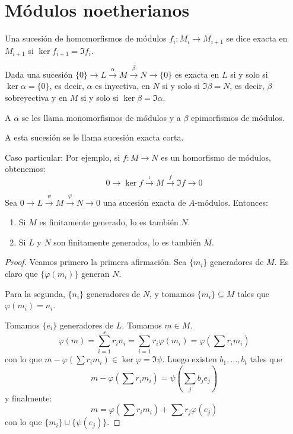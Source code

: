 \section{Módulos noetherianos}

\begin{df}
  Una sucesión de homomorfismos de módulos \(f_i:M_i\longrightarrow  M_{i+1}\) se dice
  exacta en \(M_{i+1}\) si \(\ker f_{i+1}=\Im f_i\).
\end{df}

\begin{ejemplo}
  Dada una sucesión \(\{0\}\longrightarrow L 
  \overset{\alpha}{\longrightarrow} M 
  \overset{\beta}{\longrightarrow} N\longrightarrow \{0\}\)
  es exacta en \(L\) si y solo si \(\ker \alpha=\{0\}\), es decir,
  \(\alpha\) es inyectiva, en \(N\) si y solo si \(\Im \beta = N\),
  es decir, \(\beta\) sobreyectiva y en \(M\) si y solo si
  \(\ker\beta=\Im\alpha\).
   
  A \(\alpha\) se les llama monomorfismos de módulos y a
  \(\beta\) epimorfismos de módulos.

  A esta sucesión se le llama sucesión exacta corta.

  Caso particular: Por ejemplo, si \(f:M\longrightarrow N\) es
  un homorfismo de módulos, obtenemos:
  \[
    0\longrightarrow\ker f\overset{\iota}{\longrightarrow}
    M \overset{f}{\longrightarrow}\Im f
    \longrightarrow 0
  \]
\end{ejemplo}

\begin{prop}
  Sea \(0\longrightarrow L\overset{\psi}{\longrightarrow} M
  \overset{\varphi}{\longrightarrow}
  N\longrightarrow 0\) una sucesión exacta de \(A\)-módulos. Entonces:
  \begin{enumerate}
    \item Si \(M\) es finitamente generado, lo es también \(N\).
    \item Si \(L\) y \(N\) son finitamente generados, lo es también \(M\).
  \end{enumerate}
\end{prop}

\begin{proof}
  Veamos primero la primera afirmación. Sea \(\{m_i\}\) generadores de \(M\).
  Es claro que \(\{\varphi(m_i)\}\) generan \(N\).

  Para la segunda, \(\{n_i\}\) generadores de \(N\), y tomamos
  \(\{m_i\}\subseteq M\) tales que \(\varphi(m_i)= n_i\).

  Tomamos \(\{e_i\}\) generadores de \(L\). Tomamos \(m\in M\).
  \[
    \varphi(m)=\sum_{i=1}^s r_i n_i = \sum_{i=1} r_i\varphi(m_i)
    =\varphi\left(\sum r_i m_i\right)
  \]
  con lo que \(m-\varphi(\sum r_i m_i)\in\ker\varphi=\Im\psi\).
  Luego existen \(b_1,\ldots, b_t\) tales que
  \[
    m-\varphi\left(\sum r_i m_i\right)=
    \psi\left(\sum_j b_j e_j\right)
  \]
  y finalmente:
  \[
    m=\varphi\left(\sum r_i m_i\right)+\sum r_j \varphi(e_j)
  \]
  con lo que \(\{m_i\}\cup\{\psi(e_j)\}\).
\end{proof}

